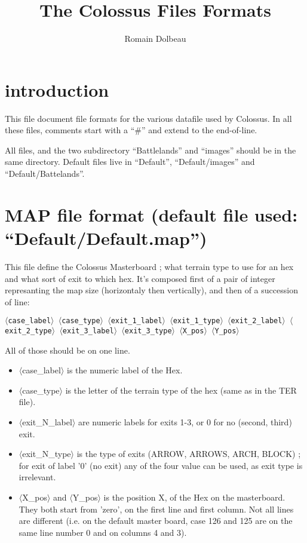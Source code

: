 \documentclass{article}
\begin{document}

\title{The Colossus Files Formats}

\author{Romain Dolbeau}

\maketitle


\section* {introduction}

This file document file formats for the various datafile used
by Colossus. In all these files, comments start with
a ``\#'' and extend to the end-of-line.

All files, and the two subdirectory ``Battlelands'' and ``images''
should be in the same directory. Default files live in
``Default'', ``Default/images'' and ``Default/Battelands''.

\section {MAP file format (default file used: ``Default/Default.map'')}

This file define the Colossus Masterboard ; what terrain type to use
for an hex and what sort of exit to which hex. It's composed
first of a pair of integer represanting the map size
(horizontaly then vertically), and then
of a succession of line:

\texttt{$\langle$case\_label$\rangle$ $\langle$case\_type$\rangle$
 $\langle$exit\_1\_label$\rangle$ $\langle$exit\_1\_type$\rangle$
 $\langle$exit\_2\_label$\rangle$ $\langle$exit\_2\_type$\rangle$
 $\langle$exit\_3\_label$\rangle$ $\langle$exit\_3\_type$\rangle$
 $\langle$X\_pos$\rangle$ $\langle$Y\_pos$\rangle$}

All of those should be on one line.

\begin{itemize}
\item $\langle$case\_label$\rangle$ is the numeric label of the Hex.
\item $\langle$case\_type$\rangle$ is the letter of the terrain type of the hex (same as in the TER file).
\item $\langle$exit\_N\_label$\rangle$ are numeric labels for exits 1-3, or 0 for no (second, third) exit.
\item $\langle$exit\_N\_type$\rangle$ is the type of exits (ARROW, ARROWS, ARCH, BLOCK) ; for exit of label '0' (no exit) any of the four value can be used, as exit type is irrelevant.
\item $\langle$X\_pos$\rangle$ and $\langle$Y\_pos$\rangle$ is the position X, of the Hex on the masterboard. They both start from 'zero', on the first line and first column. Not all lines are different (i.e. on the default master board, case 126 and 125 are on the same line number 0 and on columns 4 and 3).
\end{itemize}
\end{document}

